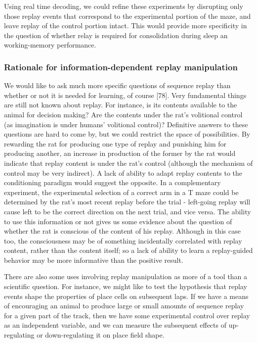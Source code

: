 \documentclass[]{article}
\begin{document}
Using real time decoding, we could refine these experiments by
disrupting only those replay events that correspond to the experimental
portion of the maze, and leave replay of the control portion intact.
This would provide more specificity in the question of whether relay is
required for consolidation during sleep an working-memory performance.

\subsubsection{Rationale for information-dependent replay manipulation}

We would like to ask much more specific questions of sequence replay
than whether or not it is needed for learning, of course {[}78{]}. Very
fundamental things are still not known about replay. For instance, is
its contents available to the animal for decision making? Are the
contents under the rat's volitional control (as imagination is under
humans' volitional control)? Definitive answers to these questions are
hard to come by, but we could restrict the space of possibilities. By
rewarding the rat for producing one type of replay and punishing him for
producing another, an increase in production of the former by the rat
would indicate that replay content is under the rat's control (although
the mechanism of control may be very indirect). A lack of ability to
adapt replay contents to the conditioning paradigm would suggest the
opposite. In a complementary experiment, the experimental selection of a
correct arm in a T maze could be determined by the rat's most recent
replay before the trial - left-going replay will cause left to be the
correct direction on the next trial, and vice versa. The ability to use
this information or not gives us some evidence about the question of
whether the rat is conscious of the content of his replay. Although in
this case too, the consciousness may be of something incidentally
correlated with replay content, rather than the content itself; so a
lack of ability to learn a replay-guided behavior may be more
informative than the positive result.

There are also some uses involving replay manipulation as more of a tool
than a scientific question. For instance, we might like to test the
hypothesis that replay events shape the properties of place cells on
subsequent laps. If we have a means of encouraging an animal to produce
large or small amounts of sequence replay for a given part of the track,
then we have some experimental control over replay as an independent
variable, and we can measure the subsequent effects of up-regulating or
down-regulating it on place field shape.
\end{document}
